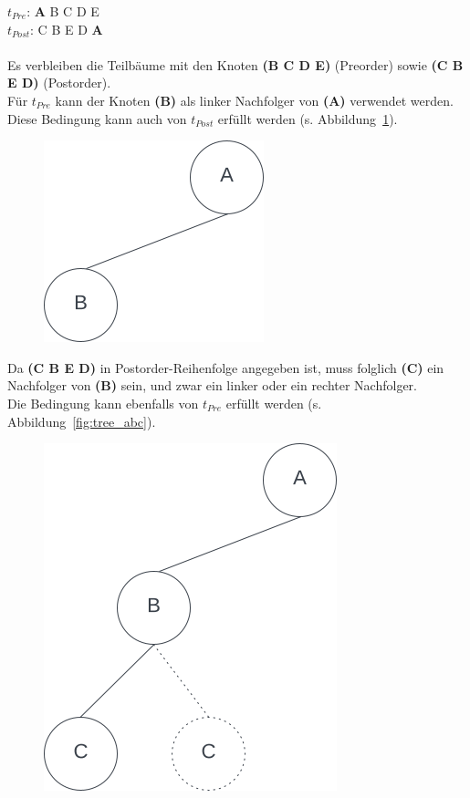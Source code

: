 \noindent
$t_{Pre}$: \textbf{A} B C D E\\
$t_{Post}$: C B E D \textbf{A}\\


\\
Es verbleiben die Teilbäume mit den Knoten \textbf{(B C D E)} (Preorder) sowie \textbf{(C B E D)} (Postorder).\\

\noindent
Für $t_{Pre}$ kann der Knoten \textbf{(B)} als linker Nachfolger von \textbf{(A)} verwendet werden.\\
Diese Bedingung kann auch von $t_{Post}$ erfüllt werden (s. Abbildung~\ref{fig:tree_ab}).

\begin{figure}
    \begin{center}
        \includegraphics[scale=0.5]{chapters/5. Binäre Bäume/img/ab}
        \caption{}
        \label{fig:tree_ab}
    \end{center}
\end{figure}


Da \textbf{(C B E D)} in Postorder-Reihenfolge angegeben ist, muss folglich \textbf{(C)} ein Nachfolger von \textbf{(B)} sein, und zwar ein linker oder ein rechter Nachfolger. \\
Die Bedingung kann ebenfalls von $t_{Pre}$ erfüllt werden (s. Abbildung~\ref{fig:tree_abc}).\\

\begin{figure}
    \begin{center}
        \includegraphics[scale=0.5]{chapters/5. Binäre Bäume/img/abc}
        \caption{}
        \label{fig:tree-abc}
    \end{center}
\end{figure}

